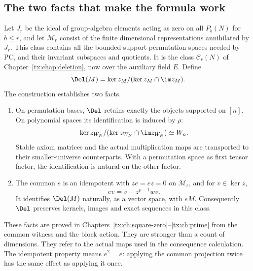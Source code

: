 \subsection{The two facts that make the formula work}
Let $J_r$ be the ideal of group-algebra elements acting as zero on all
$P_b(N)$ for $b\le r$, and let $\mathcal M_r$ consist of the finite
dimensional representations annihilated by $J_r$. This class contains
all the bounded-support permutation spaces needed by PC, and their
invariant subspaces and quotients. It is the class $\mathcal C_r(N)$
of Chapter~\ref{tx:chap:deletion}, now over the auxiliary field $E$.
Define
\[
               \Del(M)=\ker z_M/(\ker z_M\cap\im z_M).
\]
The construction establishes two facts.
\begin{enumerate}
\item On permutation bases, $\Del$ retains exactly the objects supported
on $[n]$. On polynomial spaces its identification is induced by $\rho$:
\[
 \ker z_{W_N}/(\ker z_{W_N}\cap\im z_{W_N})\simeq W_n.
\]
Stable axiom matrices and the actual multiplication maps are transported
to their smaller-universe counterparts. With a permutation space as
first tensor factor, the identification is natural on the other factor.
\item The common $e$ is an idempotent with $ze=ez=0$ on
$\mathcal M_r$, and for $v\in\ker z$,
\begin{equation}\label{tx:lift-eq:onker}
                             ev=v-z^{p-1}wv.
\end{equation}
It identifies $\Del(M)$ naturally, as a vector space, with $eM$.
Consequently $\Del$ preserves kernels, images and exact sequences in
this class.
\end{enumerate}
These facts are proved in
Chapters~\ref{tx:ch:square-zero}--\ref{tx:ch:prime} from the common
witness and the block action. They are stronger than a count of dimensions. They refer to
the actual maps used in the consequence calculation.
The idempotent property means $e^2=e$: applying the common projection
twice has the same effect as applying it once.


